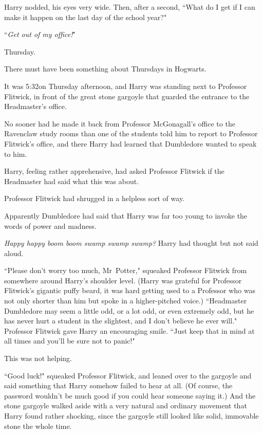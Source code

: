 Harry nodded, his eyes very wide. Then, after a second, ``What do I get if I can make it happen on the last day of the school year?"

``\emph{Get out of my office!}"

\later

Thursday.

There must have been something about Thursdays in Hogwarts.

It was 5:32\pm on Thursday afternoon, and Harry was standing next to Professor Flitwick, in front of the great stone gargoyle that guarded the entrance to the Headmaster's office.

No sooner had he made it back from Professor McGonagall's office to the Ravenclaw study rooms than one of the students told him to report to Professor Flitwick's office, and there Harry had learned that Dumbledore wanted to speak to him.

Harry, feeling rather apprehensive, had asked Professor Flitwick if the Headmaster had said what this was about.

Professor Flitwick had shrugged in a helpless sort of way.

Apparently Dumbledore had said that Harry was far too young to invoke the words of power and madness.

\emph{Happy happy boom boom swamp swamp swamp?} Harry had thought but not said aloud.

``Please don't worry too much, Mr~Potter," squeaked Professor Flitwick from somewhere around Harry's shoulder level. (Harry was grateful for Professor Flitwick's gigantic puffy beard, it was hard getting used to a Professor who was not only shorter than him but spoke in a higher-pitched voice.) ``Headmaster Dumbledore may seem a little odd, or a lot odd, or even extremely odd, but he has never hurt a student in the slightest, and I don't believe he ever will." Professor Flitwick gave Harry an encouraging smile. ``Just keep that in mind at all times and you'll be sure not to panic!"

This was not helping.

``Good luck!" squeaked Professor Flitwick, and leaned over to the gargoyle and said something that Harry somehow failed to hear at all. (Of course, the password wouldn't be much good if you could hear someone saying it.) And the stone gargoyle walked aside with a very natural and ordinary movement that Harry found rather shocking, since the gargoyle still looked like solid, immovable stone the whole time.

